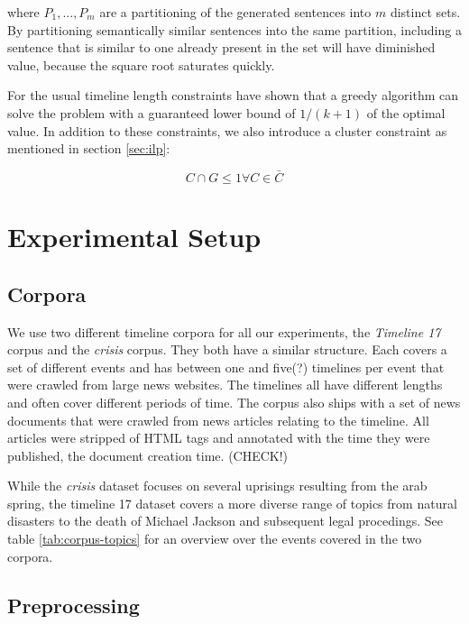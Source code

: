 \documentclass[a4paper,BCOR=10mm]{report}
\begin{document}
where $P_1, ..., P_m$ are a partitioning of the generated sentences into $m$ distinct sets. By partitioning semantically similar sentences into the same partition, including a sentence that is similar to one already present in the set will have diminished value, because the square root saturates quickly.

 For the usual timeline length constraints \citet{markert} have shown that a greedy algorithm can solve the problem with a guaranteed lower bound of $1 / (k + 1)$ of the optimal value.
 In addition to these constraints, we also introduce a cluster constraint as mentioned in section \ref{sec:ilp}:

\begin{displaymath}
C \cap G \leq 1 \forall C \in \bar{C}
\end{displaymath}

\chapter{Experimental Setup}

\section{Corpora}

We use two different timeline corpora for all our experiments, the \textit{Timeline 17} corpus \citet{tran-tl17} and the \textit{crisis} corpus. They both have a similar structure. Each covers a set of different events and has between one and five(?) timelines per event that were crawled from large news websites. The timelines all have different lengths and often cover different periods of time. The corpus also ships with a set of news documents that were crawled from news articles relating to the timeline. All articles were stripped of HTML tags and annotated with the time they were published, the document creation time. (CHECK!)

While the \textit{crisis} dataset focuses on several uprisings resulting from the arab spring, the timeline 17 dataset covers a more diverse range of topics from natural disasters to the death of Michael Jackson and subsequent legal procedings. See table \ref{tab:corpus-topics} for an overview over the events covered in the two corpora.

\section{Preprocessing}
\end{document}
